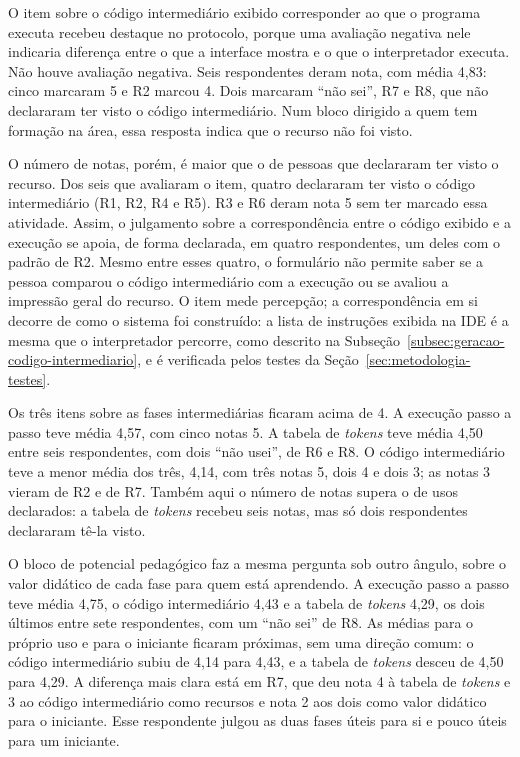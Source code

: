 O item sobre o código intermediário exibido corresponder ao que o programa executa recebeu destaque no protocolo, porque uma avaliação negativa nele indicaria diferença entre o que a interface mostra e o que o interpretador executa. Não houve avaliação negativa. Seis respondentes deram nota, com média 4,83: cinco marcaram 5 e R2 marcou 4. Dois marcaram ``não sei'', R7 e R8, que não declararam ter visto o código intermediário. Num bloco dirigido a quem tem formação na área, essa resposta indica que o recurso não foi visto.

O número de notas, porém, é maior que o de pessoas que declararam ter visto o recurso. Dos seis que avaliaram o item, quatro declararam ter visto o código intermediário (R1, R2, R4 e R5). R3 e R6 deram nota 5 sem ter marcado essa atividade. Assim, o julgamento sobre a correspondência entre o código exibido e a execução se apoia, de forma declarada, em quatro respondentes, um deles com o padrão de R2. Mesmo entre esses quatro, o formulário não permite saber se a pessoa comparou o código intermediário com a execução ou se avaliou a impressão geral do recurso. O item mede percepção; a correspondência em si decorre de como o sistema foi construído: a lista de instruções exibida na IDE é a mesma que o interpretador percorre, como descrito na Subseção~\ref{subsec:geracao-codigo-intermediario}, e é verificada pelos testes da Seção~\ref{sec:metodologia-testes}.

Os três itens sobre as fases intermediárias ficaram acima de 4. A execução passo a passo teve média 4,57, com cinco notas 5. A tabela de \textit{tokens} teve média 4,50 entre seis respondentes, com dois ``não usei'', de R6 e R8. O código intermediário teve a menor média dos três, 4,14, com três notas 5, dois 4 e dois 3; as notas 3 vieram de R2 e de R7. Também aqui o número de notas supera o de usos declarados: a tabela de \textit{tokens} recebeu seis notas, mas só dois respondentes declararam tê-la visto.

O bloco de potencial pedagógico faz a mesma pergunta sob outro ângulo, sobre o valor didático de cada fase para quem está aprendendo. A execução passo a passo teve média 4,75, o código intermediário 4,43 e a tabela de \textit{tokens} 4,29, os dois últimos entre sete respondentes, com um ``não sei'' de R8. As médias para o próprio uso e para o iniciante ficaram próximas, sem uma direção comum: o código intermediário subiu de 4,14 para 4,43, e a tabela de \textit{tokens} desceu de 4,50 para 4,29. A diferença mais clara está em R7, que deu nota 4 à tabela de \textit{tokens} e 3 ao código intermediário como recursos e nota 2 aos dois como valor didático para o iniciante. Esse respondente julgou as duas fases úteis para si e pouco úteis para um iniciante.

